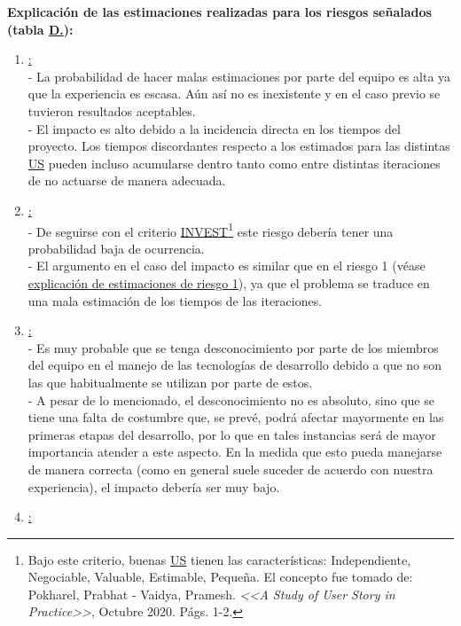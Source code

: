 \documentclass[a4paper, 12pt,twoside]{report}  %
\numberwithin{equation}{subsection} %
\begin{document}
\textbf{Explicación de las estimaciones realizadas para los riesgos señalados (tabla \hyperref[tabla_riesgos]{D.\tempTblRiesgos}):}
\begin{enumerate}
	\item \underline{\hypertarget{explicacion_estimacion_riesgo_uno}{}:}\\
	- La probabilidad de hacer malas estimaciones por parte del equipo es alta ya que la experiencia es escasa. Aún así no es inexistente y en el caso previo se tuvieron resultados aceptables.\\
	- El impacto es alto debido a la incidencia directa en los tiempos del proyecto. Los tiempos discordantes respecto a los estimados para las distintas \hyperlink{US}{US} pueden incluso acumularse dentro tanto como entre distintas iteraciones de no actuarse de manera adecuada.
	\item \underline{:}\\
	- De seguirse con el criterio \hyperlink{INVEST}{INVEST}\footnote{Bajo este criterio, buenas \hyperlink{US}{US} tienen las características: Independiente, Negociable, Valuable, Estimable, Pequeña. El concepto fue tomado de: Pokharel, Prabhat - Vaidya, Pramesh. \textit{<<A Study of User Story in Practice>>}, Octubre 2020. Págs. 1-2.} este riesgo debería tener una probabilidad baja de ocurrencia.\\
	- El argumento en el caso del impacto es similar que en el riesgo 1 (véase \hyperlink{explicacion_estimacion_riesgo_uno}{explicación de estimaciones de riesgo 1}), ya que el problema se traduce en una mala estimación de los tiempos de las iteraciones.
	\item \underline{:}\\
	- Es muy probable que se tenga desconocimiento por parte de los miembros del equipo en el manejo de las tecnologías de desarrollo debido a que no son las que habitualmente se utilizan por parte de estos.\\
	- A pesar de lo mencionado, el desconocimiento no es absoluto, sino que se tiene una falta de costumbre que, se prevé, podrá afectar mayormente en las primeras etapas del desarrollo, por lo que en tales instancias será de mayor importancia atender a este aspecto. En la medida que esto pueda manejarse de manera correcta (como en general suele suceder de acuerdo con nuestra experiencia), el impacto debería ser muy bajo.
	\item \underline{:}\\

\end{enumerate}
\end{document}
